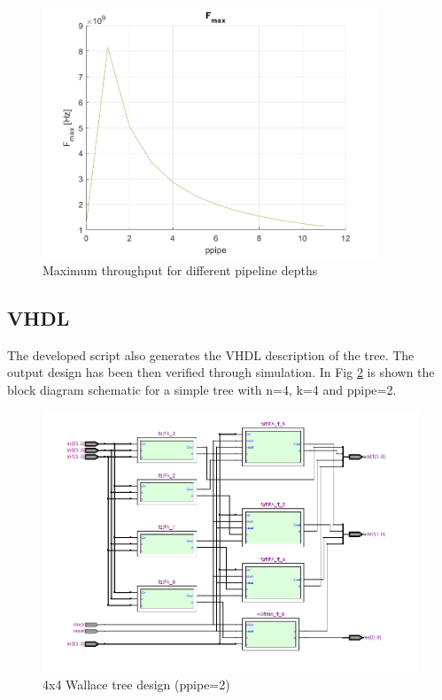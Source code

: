 \begin{figure}[H]
	\centering
	\includegraphics[width=10cm]{immagini/radix2ppipe2/fmax_pipe.png}
	\caption{Maximum throughput for different pipeline depths}
	\label{fmax}
\end{figure}
   
\subsection{VHDL}
The developed script also generates the VHDL description of the tree. The output design has been then verified through simulation. In Fig \ref{fig:schem} is shown the block diagram schematic for a simple tree with n=4, k=4 and ppipe=2.  

\begin{figure}[H]
	\includegraphics[trim={0 1.2cm 0 0},clip=true,scale=0.8]{./immagini/4x4.png}
	\caption{4x4 Wallace tree design (ppipe=2)}
	\label{fig:schem}
\end{figure}

